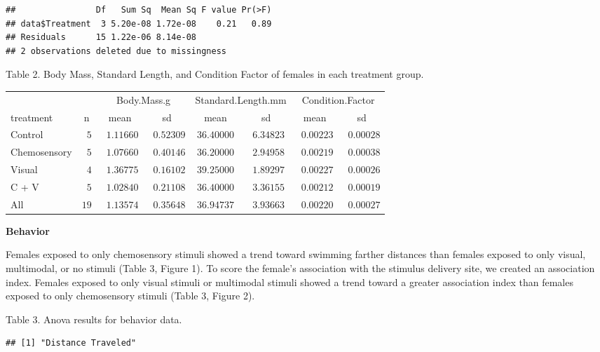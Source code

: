 \documentclass[
  12pt,
]{article}
\begin{document}
\begin{verbatim}
##                Df   Sum Sq  Mean Sq F value Pr(>F)
## data$Treatment  3 5.20e-08 1.72e-08    0.21   0.89
## Residuals      15 1.22e-06 8.14e-08               
## 2 observations deleted due to missingness
\end{verbatim}

Table 2. Body Mass, Standard Length, and Condition Factor of females in each treatment group.

\begin{tabular}{lccccccc}
\hline
 &  & \multicolumn{2}{c}{Body.Mass.g} & \multicolumn{2}{c}{Standard.Length.mm} & \multicolumn{2}{c}{Condition.Factor} \\ 
treatment  & n & mean & sd & mean & sd & mean & \multicolumn{1}{c}{sd} \\ 
\hline
Control  & $\phantom{0}5$ & $\phantom{0}1.11660$ & $\phantom{0}0.52309$ & $36.40000$ & $\phantom{0}6.34823$ & $\phantom{0}0.00223$ & $\phantom{0}0.00028$ \\
Chemosensory  & $\phantom{0}5$ & $\phantom{0}1.07660$ & $\phantom{0}0.40146$ & $36.20000$ & $\phantom{0}2.94958$ & $\phantom{0}0.00219$ & $\phantom{0}0.00038$ \\
Visual  & $\phantom{0}4$ & $\phantom{0}1.36775$ & $\phantom{0}0.16102$ & $39.25000$ & $\phantom{0}1.89297$ & $\phantom{0}0.00227$ & $\phantom{0}0.00026$ \\
C + V  & $\phantom{0}5$ & $\phantom{0}1.02840$ & $\phantom{0}0.21108$ & $36.40000$ & $\phantom{0}3.36155$ & $\phantom{0}0.00212$ & $\phantom{0}0.00019$ \\
All  & $19$ & $\phantom{0}1.13574$ & $\phantom{0}0.35648$ & $36.94737$ & $\phantom{0}3.93663$ & $\phantom{0}0.00220$ & $\phantom{0}0.00027$ \\
\hline 
\end{tabular}

\textbf{Behavior}

Females exposed to only chemosensory stimuli showed a trend toward swimming farther distances than females exposed to only visual, multimodal, or no stimuli (Table 3, Figure 1). To score the female's association with the stimulus delivery site, we created an association index. Females exposed to only visual stimuli or multimodal stimuli showed a trend toward a greater association index than females exposed to only chemosensory stimuli (Table 3, Figure 2).

Table 3. Anova results for behavior data.

\begin{verbatim}
## [1] "Distance Traveled"
\end{verbatim}
\end{document}
